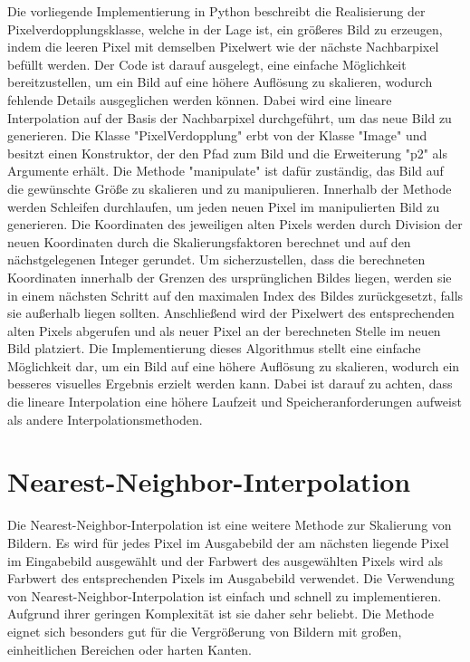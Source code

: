        Die vorliegende Implementierung in Python beschreibt die Realisierung der Pixelverdopplungsklasse, welche in der Lage ist, ein größeres Bild zu erzeugen, indem die leeren Pixel mit demselben Pixelwert wie der nächste Nachbarpixel befüllt werden.
        Der Code ist darauf ausgelegt, eine einfache Möglichkeit bereitzustellen, um ein Bild auf eine höhere Auflösung zu skalieren, wodurch fehlende Details ausgeglichen werden können.
        Dabei wird eine lineare Interpolation auf der Basis der Nachbarpixel durchgeführt, um das neue Bild zu generieren.
        Die Klasse "PixelVerdopplung" erbt von der Klasse "Image" und besitzt einen Konstruktor, der den Pfad zum Bild und die Erweiterung "p2" als Argumente erhält. 
        Die Methode "manipulate" ist dafür zuständig, das Bild auf die gewünschte Größe zu skalieren und zu manipulieren.
        Innerhalb der Methode werden Schleifen durchlaufen, um jeden neuen Pixel im manipulierten Bild zu generieren. 
        Die Koordinaten des jeweiligen alten Pixels werden durch Division der neuen Koordinaten durch die Skalierungsfaktoren berechnet und auf den nächstgelegenen Integer gerundet.
        Um sicherzustellen, dass die berechneten Koordinaten innerhalb der Grenzen des ursprünglichen Bildes liegen, werden sie in einem nächsten Schritt auf den maximalen Index des Bildes zurückgesetzt, falls sie außerhalb liegen sollten. 
        Anschließend wird der Pixelwert des entsprechenden alten Pixels abgerufen und als neuer Pixel an der berechneten Stelle im neuen Bild platziert.
        Die Implementierung dieses Algorithmus stellt eine einfache Möglichkeit dar, um ein Bild auf eine höhere Auflösung zu skalieren, wodurch ein besseres visuelles Ergebnis erzielt werden kann. 
        Dabei ist darauf zu achten, dass die lineare Interpolation eine höhere Laufzeit und Speicheranforderungen aufweist als andere Interpolationsmethoden.
        
    \section{Nearest-Neighbor-Interpolation}
        Die Nearest-Neighbor-Interpolation ist eine weitere Methode zur Skalierung von Bildern. 
        Es wird für jedes Pixel im Ausgabebild der am nächsten liegende Pixel im Eingabebild ausgewählt und der Farbwert des ausgewählten Pixels wird als Farbwert des entsprechenden Pixels im Ausgabebild verwendet.
        Die Verwendung von Nearest-Neighbor-Interpolation ist einfach und schnell zu implementieren. 
        Aufgrund ihrer geringen Komplexität ist sie daher sehr beliebt. 
        Die Methode eignet sich besonders gut für die Vergrößerung von Bildern mit großen, einheitlichen Bereichen oder harten Kanten. 
        

